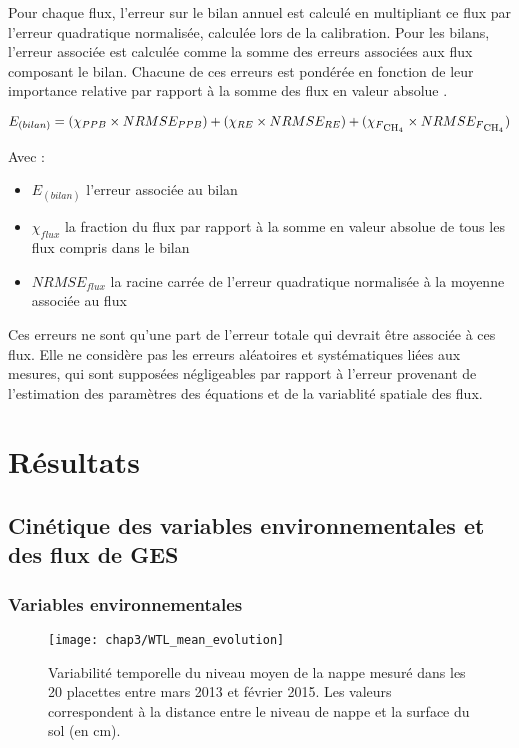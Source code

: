 Pour chaque flux, l'erreur sur le bilan annuel est calculé en multipliant ce flux par l'erreur quadratique normalisée, calculée lors de la calibration.
Pour les bilans, l'erreur associée est calculée comme la somme des erreurs associées aux flux composant le bilan.
Chacune de ces erreurs est pondérée en fonction de leur importance relative par rapport à la somme des flux en valeur absolue \citep{waddington2000}.

\begin{equation}
E_{(bilan)} = (\chi_{PPB} \times NRMSE_{PPB}) + (\chi_{RE} \times NRMSE_{RE}) + (\chi_{F\textsubscript{CH\textsubscript{4}}} \times NRMSE_{F\textsubscript{CH\textsubscript{4}}})
\end{equation}

Avec : 
\begin{itemize}
\item $E_{(bilan)}$ l'erreur associée au bilan
\item $\chi_{flux}$ la fraction du flux par rapport à la somme en valeur absolue de tous les flux compris dans le bilan
\item $NRMSE_{flux}$ la racine carrée de l'erreur quadratique normalisée à la moyenne associée au flux
\end{itemize}

Ces erreurs ne sont qu'une part de l'erreur totale qui devrait être associée à ces flux. Elle ne considère pas les erreurs aléatoires et systématiques liées aux mesures, qui sont supposées négligeables par rapport à l'erreur provenant de l'estimation des paramètres des équations et de la variablité spatiale des flux.


\section{Résultats}

\subsection{Cinétique des variables environnementales et des flux de GES}

\subsubsection{Variables environnementales}

\begin{figure}
\centering
\texttt{[image: chap3/WTL\_mean\_evolution]}
\caption{Variabilité temporelle du niveau moyen de la nappe mesuré dans les 20 placettes entre mars 2013 et février 2015. Les valeurs correspondent à la distance entre le niveau de nappe et la surface du sol (en cm).}
\label{fig:WTL_mean_evolution}
\end{figure}

